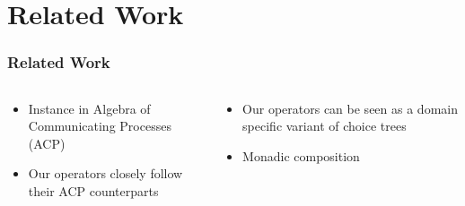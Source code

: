 \documentclass[fleqn,aspectratio=169,10pt]{beamer}
\begin{document}

\section{Related Work}

\begin{frame}[fragile]
  \frametitle{Related Work}
    \pause
  \vspace*{-2ex}
  \begin{columns}
    \begin{column}{.45\textwidth}
      \begin{itemize}
        \item Instance in Algebra of Communicating Processes (ACP)
        \item Our operators closely follow their ACP counterparts
      \end{itemize}
      \vspace*{-2ex}
      \begin{figure}
        \centering
      \end{figure}
    \end{column}
    \pause
    \begin{column}{.45\textwidth}
      \begin{itemize}
        \item Our operators can be seen as a domain specific variant of choice trees
        \item Monadic composition
      \end{itemize}
      \vspace*{-2ex}
      \begin{figure}
        \centering

\end{figure}
\end{column}
\end{columns}
\end{frame}
\end{document}

